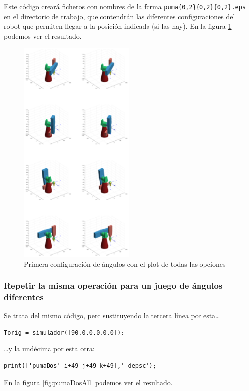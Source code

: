 \documentclass{article}
\newcommand{\fref}[1]{figura \ref{fig:#1}}
\begin{document}
Este código creará ficheros con nombres de la forma {\tt puma\{0,2\}\{0,2\}\{0,2\}.eps} en el directorio de trabajo, que contendrán las diferentes configuraciones del robot que
permiten llegar a la posición indicada (si las hay). En la \fref{pumaAll} podemos ver el resultado.

\begin{figure}[h]
\centering
\includegraphics[width=0.5\textwidth]{montage.eps}
\caption{Primera configuración de ángulos con el plot de todas las opciones}
\label{fig:pumaAll}
\end{figure}


\subsubsection{Repetir la misma operación para un juego de ángulos diferentes}
Se trata del mismo código, pero sustituyendo la tercera línea por esta…
\begin{lstlisting}[frame=single]
Torig = simulador([90,0,0,0,0,0]);
\end{lstlisting}
…y la undécima por esta otra:
\begin{lstlisting}[frame=single]
            print(['pumaDos' i+49 j+49 k+49],'-depsc');
\end{lstlisting}

En la \fref{pumaDosAll} podemos ver el resultado.
\end{document}
